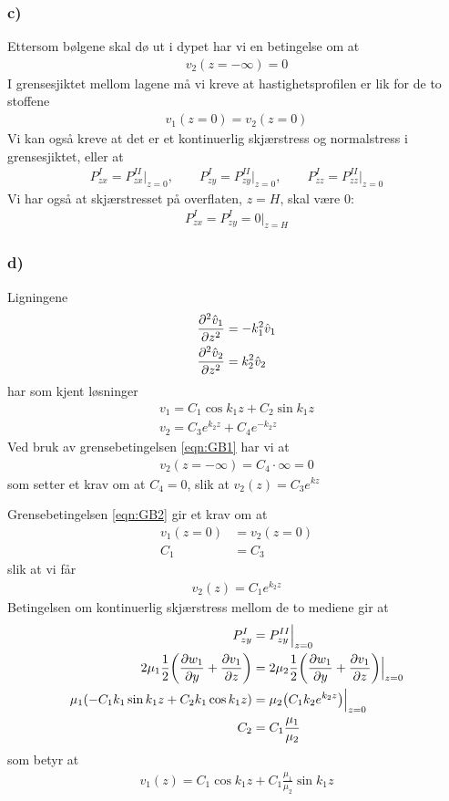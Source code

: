 \documentclass[12p,a4paper]{article}
\renewcommand{\exp}{e^}
\newcommand{\h}{\hat}
\newcommand{\half}{\frac{1}{2}}
\renewcommand{\exp}{e^}
\begin{document}
\subsubsection*{c)}
Ettersom bølgene skal dø ut i dypet har vi en betingelse om at
\begin{align}\label{eqn:GB1}
    v_2(z=-\infty) = 0
\end{align}
I grensesjiktet mellom lagene må vi kreve at hastighetsprofilen er lik for de to stoffene
\begin{align}\label{eqn:GB2}
    v_1(z=0) = v_2(z=0)
\end{align}
Vi kan også kreve at det er et kontinuerlig skjærstress og normalstress i grensesjiktet, eller at
\begin{align}
    P_{zx}^{I} = P_{zx}^{II}\Big|_{z=0}, \quad\quad P_{zy}^{I} = P_{zy}^{II}\Big|_{z=0}, \quad\quad P_{zz}^{I} = P_{zz}^{II}\Big|_{z=0}
\end{align}
Vi har også at skjærstresset på overflaten, $z=H$, skal være 0:
\begin{align}
    P_{zx}^{I} = P_{zy}^{I} = 0\Big|_{z=H}
\end{align}


\subsubsection*{d)}
Ligningene
\begin{align}
    \pdv[2]{\h v_1}{z} &= -k_1^2 \h v_1 \\
    \pdv[2]{\h v_2}{z} &= k_2^2 \h v_2
\end{align}
har som kjent løsninger
\begin{align*}
    v_1 = C_1\cos{k_1z} + C_2\sin{k_1z} \\
    v_2 = C_3\exp{k_2z} + C_4\exp{-k_2z}
\end{align*}
Ved bruk av grensebetingelsen \ref{eqn:GB1} har vi at
\begin{align*}
    v_2(z=-\infty) = C_4\cdot\infty = 0
\end{align*}
som setter et krav om at $C_4 = 0$, slik at $v_2(z) = C_3\exp{kz}$

Grensebetingelsen \ref{eqn:GB2} gir et krav om at
\begin{align*}
    v_1(z=0) &= v_2(z=0) \\
    C_1 &= C_3
\end{align*}
slik at vi får
\begin{align*}
    v_2(z) = C_1\exp{k_2z}
\end{align*}
Betingelsen om kontinuerlig skjærstress mellom de to mediene gir at
\begin{align*}
    P_{zy}^{I} &= P_{zy}^{II} \Big|_{z=0} \\
    2\mu_1\half\qty(\pdv{w_1}{y}+\pdv{v_1}{z}) &= 2\mu_2\half\qty(\pdv{w_1}{y}+\pdv{v_1}{z}) \Big|_{z=0} \\
    \mu_1\qty(-C_1k_1\sin{k_1z} + C_2k_1\cos{k_1z}) &= \mu_2\qty(C_1k_2\exp{k_2z}) \Big|_{z=0} \\
    C_2 &= C_1\frac{\mu_1}{\mu_2}
\end{align*}
som betyr at
\begin{align*}
    v_1(z) = C_1\cos{k_1z} + C_1\frac{\mu_1}{\mu_2}\sin{k_1z}
\end{align*}
\end{document}
